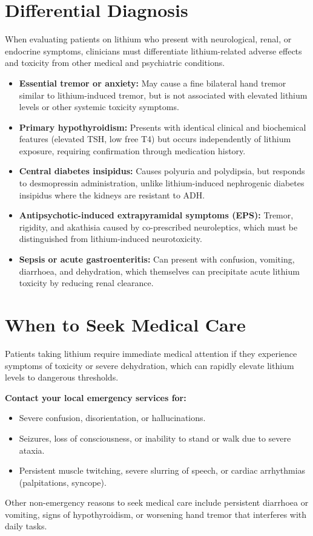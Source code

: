 \section*{Differential Diagnosis}
When evaluating patients on lithium who present with neurological, renal, or endocrine symptoms, clinicians must differentiate lithium-related adverse effects and toxicity from other medical and psychiatric conditions.
\begin{itemize}
    \item \textbf{Essential tremor or anxiety:} May cause a fine bilateral hand tremor similar to lithium-induced tremor, but is not associated with elevated lithium levels or other systemic toxicity symptoms.
    \item \textbf{Primary hypothyroidism:} Presents with identical clinical and biochemical features (elevated TSH, low free T4) but occurs independently of lithium exposure, requiring confirmation through medication history.
    \item \textbf{Central diabetes insipidus:} Causes polyuria and polydipsia, but responds to desmopressin administration, unlike lithium-induced nephrogenic diabetes insipidus where the kidneys are resistant to ADH.
    \item \textbf{Antipsychotic-induced extrapyramidal symptoms (EPS):} Tremor, rigidity, and akathisia caused by co-prescribed neuroleptics, which must be distinguished from lithium-induced neurotoxicity.
    \item \textbf{Sepsis or acute gastroenteritis:} Can present with confusion, vomiting, diarrhoea, and dehydration, which themselves can precipitate acute lithium toxicity by reducing renal clearance.
\end{itemize}

\section*{When to Seek Medical Care}
Patients taking lithium require immediate medical attention if they experience symptoms of toxicity or severe dehydration, which can rapidly elevate lithium levels to dangerous thresholds.

\textbf{Contact your local emergency services for:}
\begin{itemize}
    \item Severe confusion, disorientation, or hallucinations.
    \item Seizures, loss of consciousness, or inability to stand or walk due to severe ataxia.
    \item Persistent muscle twitching, severe slurring of speech, or cardiac arrhythmias (palpitations, syncope).
\end{itemize}
Other non-emergency reasons to seek medical care include persistent diarrhoea or vomiting, signs of hypothyroidism, or worsening hand tremor that interferes with daily tasks.

